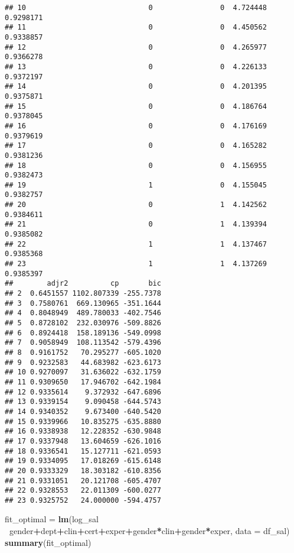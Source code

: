 \documentclass[]{article}
\newenvironment{Shaded}{\begin{snugshade}}{\end{snugshade}}
\newcommand{\DataTypeTok}[1]{\textcolor[rgb]{0.13,0.29,0.53}{#1}}
\newcommand{\KeywordTok}[1]{\textcolor[rgb]{0.13,0.29,0.53}{\textbf{#1}}}
\newcommand{\NormalTok}[1]{#1}
\newcommand{\OperatorTok}[1]{\textcolor[rgb]{0.81,0.36,0.00}{\textbf{#1}}}
\newcommand{\StringTok}[1]{\textcolor[rgb]{0.31,0.60,0.02}{#1}}
\begin{document}
\begin{verbatim}
## 10                             0                0  4.724448 0.9298171
## 11                             0                0  4.450562 0.9338857
## 12                             0                0  4.265977 0.9366278
## 13                             0                0  4.226133 0.9372197
## 14                             0                0  4.201395 0.9375871
## 15                             0                0  4.186764 0.9378045
## 16                             0                0  4.176169 0.9379619
## 17                             0                0  4.165282 0.9381236
## 18                             0                0  4.156955 0.9382473
## 19                             1                0  4.155045 0.9382757
## 20                             0                1  4.142562 0.9384611
## 21                             0                1  4.139394 0.9385082
## 22                             1                1  4.137467 0.9385368
## 23                             1                1  4.137269 0.9385397
##        adjr2          cp       bic
## 2  0.6451557 1102.807339 -255.7378
## 3  0.7580761  669.130965 -351.1644
## 4  0.8048949  489.780033 -402.7546
## 5  0.8728102  232.030976 -509.8826
## 6  0.8924418  158.189136 -549.0998
## 7  0.9058949  108.113542 -579.4396
## 8  0.9161752   70.295277 -605.1020
## 9  0.9232583   44.683982 -623.6173
## 10 0.9270097   31.636022 -632.1759
## 11 0.9309650   17.946702 -642.1984
## 12 0.9335614    9.372932 -647.6896
## 13 0.9339154    9.090458 -644.5743
## 14 0.9340352    9.673400 -640.5420
## 15 0.9339966   10.835275 -635.8880
## 16 0.9338938   12.228352 -630.9848
## 17 0.9337948   13.604659 -626.1016
## 18 0.9336541   15.127711 -621.0593
## 19 0.9334095   17.018269 -615.6148
## 20 0.9333329   18.303182 -610.8356
## 21 0.9331051   20.121708 -605.4707
## 22 0.9328553   22.011309 -600.0277
## 23 0.9325752   24.000000 -594.4757
\end{verbatim}

\begin{Shaded}
\begin{Highlighting}[]
\NormalTok{fit_optimal =}\StringTok{ }\KeywordTok{lm}\NormalTok{(log_sal }\OperatorTok{~}\NormalTok{gender}\OperatorTok{+}\NormalTok{dept}\OperatorTok{+}\NormalTok{clin}\OperatorTok{+}\NormalTok{cert}\OperatorTok{+}\NormalTok{exper}\OperatorTok{+}\NormalTok{gender}\OperatorTok{*}\NormalTok{clin}\OperatorTok{+}\NormalTok{gender}\OperatorTok{*}\NormalTok{exper, }\DataTypeTok{data =}\NormalTok{ df_sal)}
\KeywordTok{summary}\NormalTok{(fit_optimal)}
\end{Highlighting}
\end{Shaded}
\end{document}
